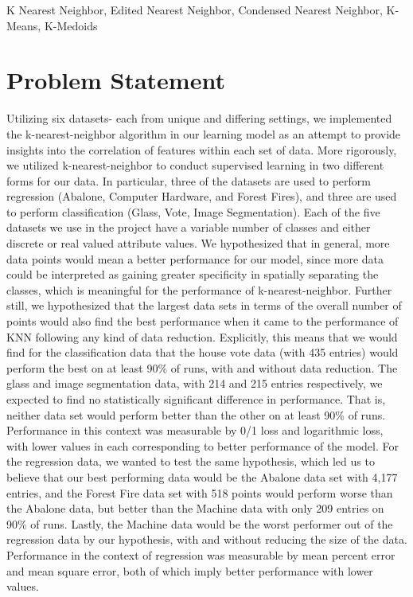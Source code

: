 \documentclass[twoside,11pt]{article}
\begin{document}
\begin{keywords}
  K Nearest Neighbor, Edited Nearest Neighbor, Condensed Nearest Neighbor, K-Means, K-Medoids
\end{keywords}

\section{Problem Statement}
Utilizing six datasets- each from unique and differing settings, we implemented the k-nearest-neighbor
algorithm in our learning model as an attempt to provide insights into the correlation 
 of features within each set of data. More rigorously, we utilized k-nearest-neighbor to conduct supervised
 learning in two different forms for our data. In particular, three of the datasets are used to perform regression (Abalone, Computer
 Hardware, and Forest Fires),
  and three are used to perform classification (Glass, Vote, Image Segmentation). Each of the five datasets we use in the project have a variable 
  number of classes and either discrete or real valued attribute values. We hypothesized that in general, more data points would mean
  a better performance for our model, since more data could be interpreted as gaining greater specificity in spatially separating the classes, which
  is meaningful for the performance of k-nearest-neighbor. Further still, we hypothesized that the largest data sets in terms of the overall number of
  points would also find the best performance when it came to the performance of KNN following any kind of data reduction. Explicitly, this means that
  we would find for the classification data that the house vote data (with 435 entries) would perform the best on at least 90\% of runs, with and without
  data reduction. The glass and image segmentation data, with 214 and 215 entries respectively, we expected to find no statistically significant difference
  in performance. That is, neither data set would perform better than the other on at least 90\% of runs. Performance in this context was measurable by
  0/1 loss and logarithmic loss, with lower values in each corresponding to better performance of the model. For the regression data, we wanted to
  test the same hypothesis, which led us to believe that our best performing data would be the Abalone data set with 4,177 entries, and the Forest
  Fire data set with 518 points would perform worse than the Abalone data, but better than the Machine data with only 209 entries on 90\% of runs.
  Lastly, the Machine data would be the worst performer out of the regression data by our hypothesis, with and without reducing the size of the data.
  Performance in the context of regression was measurable by mean percent error and mean square error, both of which imply better performance with
  lower values.
\end{document}

